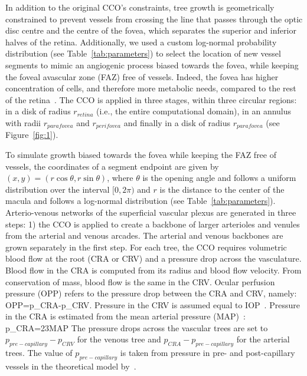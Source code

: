 \documentclass[11pt,]{article}
\let\oldequation\equation
\let\oldendequation\endequation
\renewenvironment{equation}
  {\linenomathNonumbers\oldequation}
  {\oldendequation\endlinenomath}
\begin{document}
In addition to the original CCO’s constraints, tree growth is
geometrically constrained to prevent vessels from crossing the line
that passes through the optic disc centre and the centre of the fovea,
which separates the superior and inferior halves of the
retina. Additionally, we used a custom log-normal probability distribution (see Table~\ref{tab:parameters})
to select the location of new vessel segments to mimic an angiogenic
process biased towards the fovea, while keeping the foveal avascular
zone (FAZ) free of vessels. 
Indeed, the fovea has higher concentration
of cells, and therefore more metabolic needs, compared to the rest of
the retina~\cite{Zouache2022}.
The CCO is applied in three stages, within three circular regions: in
a disk of radius $r_{retina}$ (i.e., the entire computational domain), in an annulus with radii $r_{parafovea}$ and $r_{perifovea}$
and finally in a disk of radius $r_{parafovea}$
(see Figure~\ref{fig:1}).

To simulate growth biased towards the fovea while keeping the FAZ free
of vessels, the coordinates of a segment endpoint are given by
$(x,y)=(r\cos\theta, r\sin\theta)$, where $\theta$ is the opening angle and follows a uniform
distribution over the interval $[0,2\pi)$ and $r$ is the distance to the center of the macula and follows a log-normal distribution (see Table~\ref{tab:parameters}). Arterio-venous
networks of the superficial vascular plexus are generated in three
steps: 1) the CCO is applied to create a backbone of larger arterioles
and venules from the arterial and venous arcades. The arterial and
venous backbones are grown separately in the first step. For each
tree, the CCO requires volumetric blood flow at the root (CRA or CRV)
and a pressure drop across the vasculature. Blood flow in the CRA is
computed from its radius and blood flow velocity. From conservation of
mass, blood flow is the same in the CRV.
Ocular perfusion pressure (OPP) refers to the pressure drop between the CRA and CRV, namely:
\begin{equation}
OPP=p_{CRA}-p_{CRV}.\label{eq:OPP}
\end{equation}
Pressure in the CRV is assumed equal to IOP~\cite{Arciero2013,Guidoboni2014,Zheng2010}.
Pressure in the CRA is estimated from the mean arterial pressure (MAP)~\cite{Arciero2013,Guidoboni2014,Zheng2010}:
\begin{equation}
p_{CRA}=\frac23MAP\label{eq:pCRA}
\end{equation}
The pressure drops across the vascular trees are set to
$p_{pre-capillary}-p_{CRV}$ for the venous tree and
$p_{CRA}-p_{pre-capillary}$ for the arterial trees. The value of
$p_{pre-capillary}$ is taken from pressure in pre- and post-capillary vessels in
the theoretical model by~\cite{Takahashi2009}. %
\end{document}
